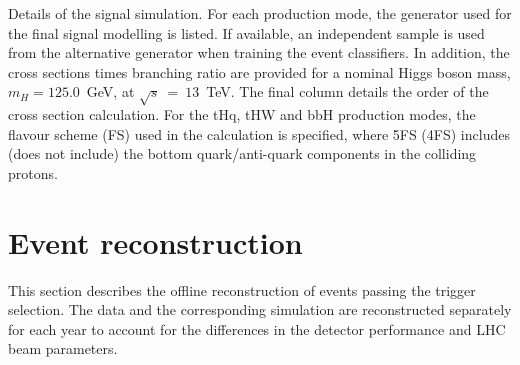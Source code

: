 \begin{table}[htb!]
    \caption[Signal simulation details]{Details of the signal simulation. For each production mode, the generator used for the final signal modelling is listed. If available, an independent sample is used from the alternative generator when training the event classifiers. In addition, the cross sections times branching ratio are provided for a nominal Higgs boson mass, $m_H=125.0$~GeV, at $\sqrt{s}~=~13$~TeV. The final column details the order of the cross section calculation. For the tHq, tHW and bbH production modes, the flavour scheme (FS) used in the calculation is specified, where 5FS (4FS) includes (does not include) the bottom quark/anti-quark components in the colliding protons.}
    \label{tab:signal_samples}
    \centering
    \scriptsize
    \hspace*{-5cm}
    \renewcommand{\arraystretch}{2}
    \setlength{\tabcolsep}{5pt}
    
    \hspace*{-5cm}
\end{table}



\section{Event reconstruction}\label{sec:event_reconstruction}
This section describes the offline reconstruction of events passing the trigger selection. The data and the corresponding simulation are reconstructed separately for each year to account for the differences in the detector performance and LHC beam parameters. 

